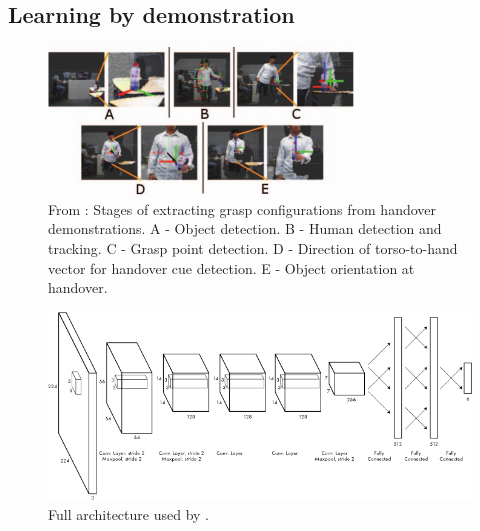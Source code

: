 \subsection{Learning by demonstration}

\begin{figure}
	\centering
	\includegraphics[width=\textwidth]{img/related-work/demonstrations.png}
	\caption{From \parencite{Chan2015a}: Stages of extracting grasp configurations from handover demonstrations. A - Object detection. B - Human detection and tracking. C - Grasp point detection. D - Direction of torso-to-hand vector for handover cue detection. E - Object orientation at handover.}
	\label{fig:rel__demonstration}
\end{figure}

\begin{figure}
	\centering
	\includegraphics[width=\textwidth]{img/related-work/cnn-architecture.png}
	\caption{Full architecture used by \textcite{Redmon2014}.}
	\label{fig:rel__cnn-arch}
\end{figure}

